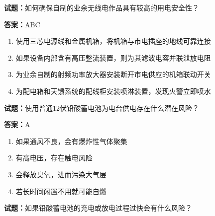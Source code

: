 \documentclass{ctexbook}
\begin{document}




\vspace{1em}

\textbf{试题：}如何确保自制的业余无线电作品具有较高的用电安全性？ 

\textbf{答案：}ABC 

\begin{enumerate}[leftmargin=3em]
  \item 使用三芯电源线和金属机箱，将机箱与市电插座的地线可靠连接 

  \item 如果设备内部含有高压整流装置，则为其滤波电容并联泄放电阻 

  \item 为业余自制的射频功率放大器安装断开市电供应的机箱联动开关 

  \item 为配电箱和天馈系统的配线柜安装喷淋装置，发现火警立即喷水 

\end{enumerate}





\vspace{1em}

\textbf{试题：}使用普通12伏铅酸蓄电池为电台供电存在什么潜在风险？ 

\textbf{答案：}A 

\begin{enumerate}[leftmargin=3em]
  \item 如果通风不良，会有爆炸性气体聚集 

  \item 有高电压，存在触电风险 

  \item 会释放臭氧，进而污染大气层 

  \item 若长时间闲置不用就可能自燃 

\end{enumerate}





\vspace{1em}

\textbf{试题：}如果铅酸蓄电池的充电或放电过程过快会有什么风险？ 
\end{document}
